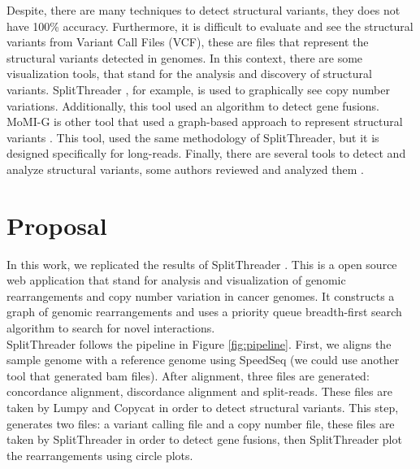 \documentclass{svproc}
\begin{document}
Despite, there are many techniques to detect structural variants, they does not have 100\% accuracy. Furthermore, it is difficult to evaluate and see the structural variants from Variant Call Files (VCF), these are files that represent the structural variants detected in genomes. In this context, there are some visualization tools, that stand for the analysis and discovery of structural variants. SplitThreader \cite{nattestad2016splitthreader}, for example, is used to graphically see copy number variations. Additionally, this tool used an algorithm to detect gene fusions.\\

MoMI-G is other tool that used a graph-based approach to represent structural variants \cite{yokoyama2019momi}. This tool, used the same methodology of SplitThreader, but it is designed specifically for long-reads. Finally, there are several tools to detect and analyze structural variants,  some authors reviewed and analyzed them \cite{yokoyama2020visualization}.

\section{Proposal} 

In this work, we replicated the results of SplitThreader \cite{nattestad2016splitthreader}. This is a open source web application that stand for  analysis and visualization of genomic rearrangements and copy number variation in cancer genomes. It constructs a graph of genomic rearrangements and uses a priority queue breadth-first search algorithm to search for novel interactions.\\

SplitThreader follows the pipeline in Figure \ref{fig:pipeline}. First, we aligns the sample genome with a reference genome using SpeedSeq (we could use another tool that generated bam files). After alignment, three files are generated: concordance alignment, discordance alignment and split-reads. These files are taken by Lumpy and Copycat in order to detect structural variants. This step, generates two files: a variant calling file and a copy number file, these files are taken by SplitThreader in order to detect gene fusions, then SplitThreader plot the rearrangements using circle plots. \\
\end{document}
